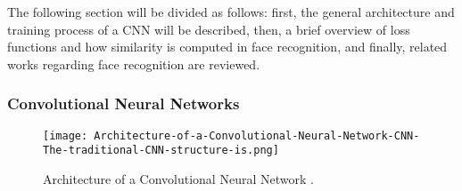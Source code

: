\documentclass[class=report, crop=false, a4paper, 12pt]{standalone}
\begin{document}
\vspace{\baselineskip}
\par The following section will be divided as follows: first, the general architecture and training process of a CNN will be described, then, a brief overview of loss functions and how similarity is computed in face recognition, and finally, related works regarding face recognition are reviewed.

\newpage
\subsubsection{Convolutional Neural Networks}
\begin{figure}[!h]
    \centering
    \texttt{[image: Architecture-of-a-Convolutional-Neural-Network-CNN-The-traditional-CNN-structure-is.png]}
    \caption{Architecture of a Convolutional Neural Network \autocite{kangDeepSimilarityMetric2019}.}
    \label{fig:cnn}
\end{figure}
\end{document}
